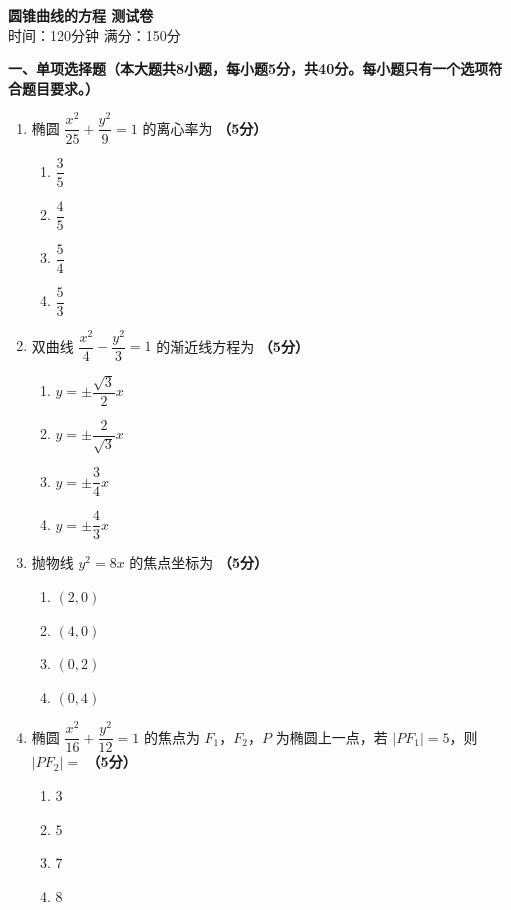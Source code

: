 \documentclass[12pt, a4paper]{ctexart}
\newcommand{\score}[1]{\hfill\textbf{（#1分）}}
\begin{document}
\begin{center}
{\Large\bfseries 圆锥曲线的方程 测试卷}\\[0.5em]
{\normalsize 时间：120分钟 \quad 满分：150分}
\end{center}

\vspace{1em}

\noindent\textbf{一、单项选择题（本大题共8小题，每小题5分，共40分。每小题只有一个选项符合题目要求。）}

\vspace{0.5em}

\begin{enumerate}
\item 椭圆 $\dfrac{x^2}{25}+\dfrac{y^2}{9}=1$ 的离心率为 \score{5}
\begin{enumerate}[label=\Alph*.]
\item $\dfrac{3}{5}$
\item $\dfrac{4}{5}$
\item $\dfrac{5}{4}$
\item $\dfrac{5}{3}$
\end{enumerate}

\item 双曲线 $\dfrac{x^2}{4}-\dfrac{y^2}{3}=1$ 的渐近线方程为 \score{5}
\begin{enumerate}[label=\Alph*.]
\item $y=\pm\dfrac{\sqrt{3}}{2}x$
\item $y=\pm\dfrac{2}{\sqrt{3}}x$
\item $y=\pm\dfrac{3}{4}x$
\item $y=\pm\dfrac{4}{3}x$
\end{enumerate}

\item 抛物线 $y^2=8x$ 的焦点坐标为 \score{5}
\begin{enumerate}[label=\Alph*.]
\item $(2,0)$
\item $(4,0)$
\item $(0,2)$
\item $(0,4)$
\end{enumerate}

\item 椭圆 $\dfrac{x^2}{16}+\dfrac{y^2}{12}=1$ 的焦点为 $F_1$，$F_2$，$P$ 为椭圆上一点，若 $|PF_1|=5$，则 $|PF_2|=$ \score{5}
\begin{enumerate}[label=\Alph*.]
\item $3$
\item $5$
\item $7$
\item $8$
\end{enumerate}


\end{enumerate}
\end{document}
